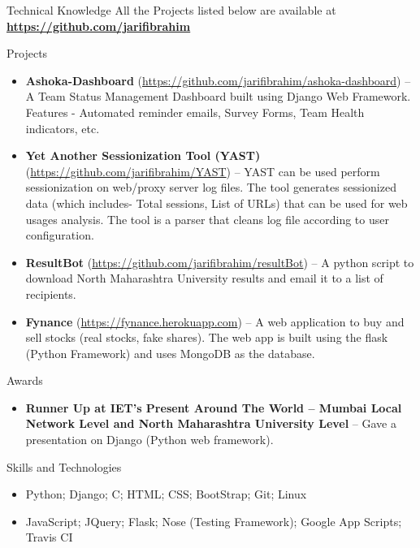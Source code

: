 \documentclass[]{mcdowellcv}
\begin{document}
	\begin{cvsection}{Technical Knowledge}{}{}
	All the Projects listed below are available at     \textbf{\url{https://github.com/jarifibrahim}}   \\     \begin{cvsubsection}{Projects}{}{}
			\begin{itemize}
			    
			    \item \textbf{Ashoka-Dashboard} (\url{https://github.com/jarifibrahim/ashoka-dashboard}) -- A Team Status Management Dashboard built using Django Web Framework. Features - Automated reminder emails, Survey Forms, Team Health indicators, etc.
			    
				\item \textbf{Yet Another Sessionization Tool (YAST)}
				(\url{https://github.com/jarifibrahim/YAST}) -- YAST can be used perform sessionization on web/proxy server log files. The tool generates sessionized data (which includes- Total sessions, List of URLs) that can be used for web usages analysis. The tool is a parser that cleans log file according to user configuration.
				
	    		\item \textbf{ResultBot}                (\url{https://github.com/jarifibrahim/resultBot}) -- A python script to download North Maharashtra University results and email it to a list of recipients. 
			    
			    \item \textbf{Fynance} (\url{https://fynance.herokuapp.com})
			        -- A web application to buy and sell stocks (real stocks, fake shares). The web app is built using the flask (Python Framework) and uses MongoDB as the database.
			\end{itemize}
		\end{cvsubsection}
	\end{cvsection}
	
	\begin{cvsection}{Awards}
		\begin{cvsubsection}{}{}{}	
			\begin{itemize}
				\item \textbf{Runner Up at IET's Present Around The World -- Mumbai Local Network Level and North Maharashtra University Level} -- Gave a presentation on Django (Python web framework).
			\end{itemize}
		\end{cvsubsection}
	\end{cvsection}
	
	\begin{cvsection}{Skills and Technologies}
		\begin{cvsubsection}{}{}{}	
			\begin{itemize}
				\item Python; Django; C; HTML; CSS; BootStrap; Git; Linux
				\item  JavaScript; JQuery; Flask; Nose (Testing Framework); Google App Scripts; Travis CI
			\end{itemize}
		\end{cvsubsection}
	\end{cvsection}
	
\end{document}
